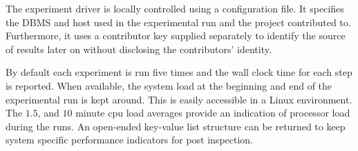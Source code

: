 \documentclass{cidr-2019}
\begin{document}
The experiment driver is locally controlled using a configuration
file. It specifies the DBMS and host used in the experimental run and
the project contributed to. Furthermore, it uses a contributor key
supplied separately to identify the source of results later on without
disclosing the contributors' identity.

By default each experiment is run five times and the wall clock time
for each step is reported. When available, the system load at the
beginning and end of the experimental run is kept around. This is
easily accessible in a Linux environment. The $1.5$, and $10$ minute
{\sc cpu} load averages provide an indication of processor load during
the runs. An open-ended key-value list structure can be returned to
keep system specific performance indicators for post inspection.







\end{document}
